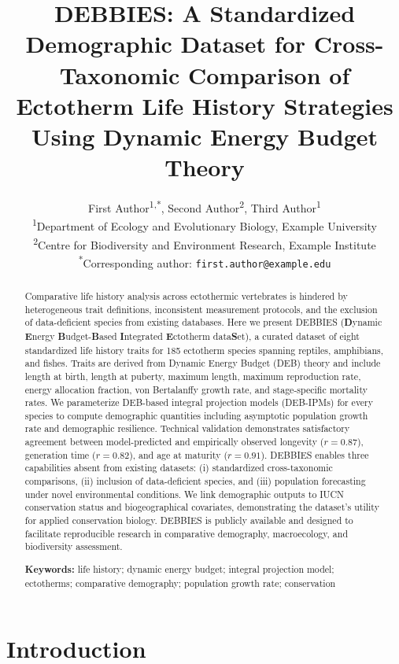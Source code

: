 \documentclass[11pt]{article}
\title{DEBBIES: A Standardized Demographic Dataset for Cross-Taxonomic Comparison of Ectotherm Life History Strategies Using Dynamic Energy Budget Theory}
\author{%
  First Author\textsuperscript{1,*},
  Second Author\textsuperscript{2},
  Third Author\textsuperscript{1}
  \\[6pt]
  \textsuperscript{1}Department of Ecology and Evolutionary Biology, Example University \\
  \textsuperscript{2}Centre for Biodiversity and Environment Research, Example Institute \\[4pt]
  \textsuperscript{*}Corresponding author: \texttt{first.author@example.edu}
}
\date{}
\begin{document}
\maketitle

\begin{abstract}
Comparative life history analysis across ectothermic vertebrates is hindered by heterogeneous trait definitions, inconsistent measurement protocols, and the exclusion of data-deficient species from existing databases. Here we present DEBBIES (\textbf{D}ynamic \textbf{E}nergy \textbf{B}udget-\textbf{B}ased \textbf{I}ntegrated \textbf{E}ctotherm data\textbf{S}et), a curated dataset of eight standardized life history traits for 185 ectotherm species spanning reptiles, amphibians, and fishes. Traits are derived from Dynamic Energy Budget (DEB) theory and include length at birth, length at puberty, maximum length, maximum reproduction rate, energy allocation fraction, von Bertalanffy growth rate, and stage-specific mortality rates. We parameterize DEB-based integral projection models (DEB-IPMs) for every species to compute demographic quantities including asymptotic population growth rate and demographic resilience. Technical validation demonstrates satisfactory agreement between model-predicted and empirically observed longevity ($r = 0.87$), generation time ($r = 0.82$), and age at maturity ($r = 0.91$). DEBBIES enables three capabilities absent from existing datasets: (i) standardized cross-taxonomic comparisons, (ii) inclusion of data-deficient species, and (iii) population forecasting under novel environmental conditions. We link demographic outputs to IUCN conservation status and biogeographical covariates, demonstrating the dataset's utility for applied conservation biology. DEBBIES is publicly available and designed to facilitate reproducible research in comparative demography, macroecology, and biodiversity assessment.

\vspace{0.5em}
\noindent\textbf{Keywords:} life history; dynamic energy budget; integral projection model; ectotherms; comparative demography; population growth rate; conservation
\end{abstract}

\section{Introduction}
\end{document}
